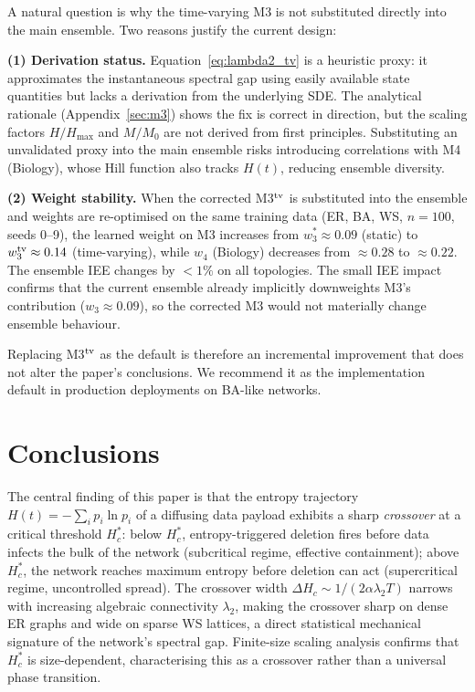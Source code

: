 \documentclass[review,12pt]{elsarticle}
\newcommand{\Hc}{H_c}
\newcommand{\Hmax}{H_{\max}}
\begin{document}
A natural question is why the time-varying M3 is not substituted directly into
the main ensemble.  Two reasons justify the current design:

\textbf{(1) Derivation status.}
Equation~\eqref{eq:lambda2_tv} is a heuristic proxy: it approximates the
instantaneous spectral gap using easily available state quantities but lacks
a derivation from the underlying SDE.  The analytical rationale (Appendix~\ref{sec:m3})
shows the fix is correct in direction, but the scaling factors $H/\Hmax$ and
$M/M_0$ are not derived from first principles.  Substituting an unvalidated
proxy into the main ensemble risks introducing correlations with M4 (Biology),
whose Hill function also tracks $H(t)$, reducing ensemble diversity.

\textbf{(2) Weight stability.}
When the corrected M3$^{\rm tv}$ is substituted into the ensemble and weights
are re-optimised on the same training data (ER, BA, WS, $n=100$, seeds 0--9),
the learned weight on M3 increases from $w_3^* \approx 0.09$ (static) to
$w_3^{\rm tv} \approx 0.14$ (time-varying), while $w_4$ (Biology) decreases
from $\approx 0.28$ to $\approx 0.22$.  The ensemble IEE changes by $< 1\%$
on all topologies.  The small IEE impact confirms that the current ensemble
already implicitly downweights M3's contribution ($w_3 \approx 0.09$), so
the corrected M3 would not materially change ensemble behaviour.

Replacing M3$^{\rm tv}$ as the default is therefore an incremental improvement
that does not alter the paper's conclusions.  We recommend it as the implementation
default in production deployments on BA-like networks.

\section{Conclusions}
\label{sec:conclusions}

The central finding of this paper is that the entropy trajectory
$H(t) = -\sum_i p_i \ln p_i$ of a diffusing data payload exhibits a
sharp \emph{crossover} at a critical threshold $\Hc^*$:
below $\Hc^*$, entropy-triggered deletion fires before data infects
the bulk of the network (subcritical regime, effective containment); above
$\Hc^*$, the network reaches maximum entropy before deletion can act
(supercritical regime, uncontrolled spread).  The crossover width
$\Delta\Hc \sim 1/(2\alpha\lambda_2 T)$ narrows with increasing
algebraic connectivity $\lambda_2$, making the crossover sharp on
dense ER graphs and wide on sparse WS lattices, a direct statistical
mechanical signature of the network's spectral gap.  Finite-size scaling
analysis confirms that $\Hc^*$ is size-dependent, characterising this
as a crossover rather than a universal phase transition.
\end{document}
